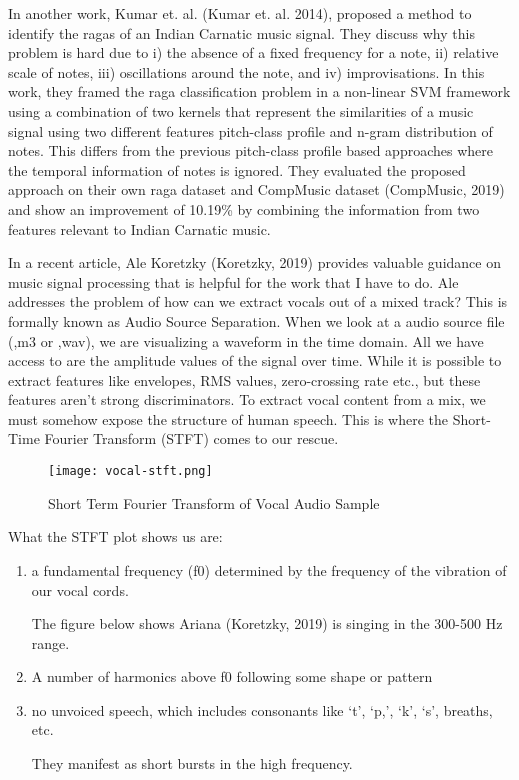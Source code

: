 \par
In another work, Kumar et. al. (Kumar et. al. 2014), proposed a method to identify the ragas of an Indian Carnatic music signal. They discuss why this problem is hard due to i) the absence of a fixed frequency for a note, ii) relative scale of notes, iii) oscillations around the note, and iv) improvisations. In this work, they framed the raga classification problem in a non-linear SVM framework using a combination of two kernels that represent the similarities of a music signal using two different features pitch-class profile and n-gram distribution of notes. This differs from the previous pitch-class profile based approaches where the temporal information of notes is ignored. They evaluated the proposed approach on their own raga dataset and CompMusic dataset (CompMusic, 2019) and show an improvement of 10.19\% by combining the information from two features relevant to Indian Carnatic music.
\par
In a recent article, Ale Koretzky (Koretzky, 2019) provides valuable guidance on music signal processing that is helpful for the work that I have to do. Ale addresses the problem of how can we extract vocals out of a mixed track? This is formally known as Audio Source Separation. When we look at a audio source file (,m3 or ,wav), we are visualizing a waveform in the time domain. All we have access to are the amplitude values of the signal over time. While it is possible to extract features like envelopes, RMS values, zero-crossing rate etc., but these features aren’t strong discriminators. To extract vocal content from a mix, we must somehow expose the structure of human speech. This is where the Short-Time Fourier Transform (STFT) comes to our rescue.
\par
\begin{figure}
  \caption{Short Term Fourier Transform of Vocal Audio Sample}
  \texttt{[image: vocal-stft.png]}
\end{figure}
What the STFT plot shows us are:
\begin{enumerate}[i]
  \item a fundamental frequency (f0) determined by the frequency of the vibration of our vocal cords.
  \par
  The figure below shows Ariana (Koretzky, 2019) is singing in the 300-500 Hz range.
  \item A number of harmonics above f0 following some shape or pattern
  \item no unvoiced speech, which includes consonants like `t', `p,', `k', `s', breaths, etc. \par
  They manifest as short bursts in the high frequency.
\end{enumerate}

